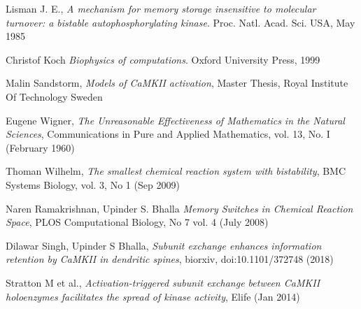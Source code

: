 \documentclass[]{resonance}
\begin{document}
\begin{thebibliography}{99} 
    Lisman J. E., 
    \textit{A mechanism for memory storage insensitive to molecular turnover: a
    bistable autophosphorylating kinase}. 
    Proc. Natl. Acad. Sci. USA, May 1985

    Christof Koch
    \textit{Biophysics of computations}.
    Oxford University Press, 1999

    Malin Sandstorm,
    \textit{Models of CaMKII activation},
    Master Thesis, Royal Institute Of Technology Sweden 

    Eugene Wigner,
    \textit{The Unreasonable Effectiveness of Mathematics in the Natural Sciences},
     Communications in Pure and Applied Mathematics, vol. 13, No. I (February 1960)

    Thoman Wilhelm,
    \textit{The smallest chemical reaction system with bistability},
    BMC Systems Biology, vol. 3, No 1 (Sep 2009)

    Naren Ramakrishnan, Upinder S. Bhalla
    \textit{Memory Switches in Chemical Reaction Space},
    PLOS Computational Biology, No 7 vol. 4 (July 2008)

    Dilawar Singh, Upinder S Bhalla,
    \textit{Subunit exchange enhances information retention by CaMKII in dendritic spines},
    biorxiv, doi:10.1101/372748 (2018)

    Stratton M et al.,
    \textit{Activation-triggered subunit exchange between CaMKII holoenzymes
    facilitates the spread of kinase activity}, Elife (Jan 2014) 

\end{thebibliography}
\end{document}
